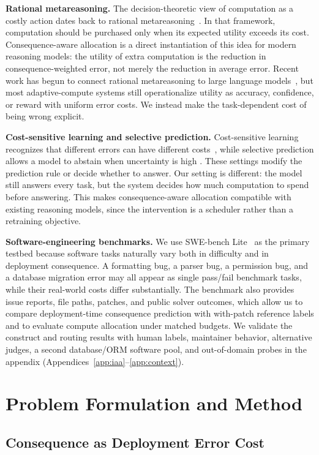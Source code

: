 \documentclass{article}
\begin{document}
\textbf{Rational metareasoning.}
The decision-theoretic view of computation as a costly action dates
back to rational metareasoning~\citep{russell1991right,
hay2012selecting}. In that framework, computation should be purchased
only when its expected utility exceeds its cost. Consequence-aware
allocation is a direct instantiation of this idea for modern reasoning
models: the utility of extra computation is the reduction in
consequence-weighted error, not merely the reduction in average error.
Recent work has begun to connect rational metareasoning to large
language models~\citep{yang2024rational}, but most adaptive-compute
systems still operationalize utility as accuracy, confidence, or reward
with uniform error costs. We instead make the task-dependent cost of
being wrong explicit.

\textbf{Cost-sensitive learning and selective prediction.}
Cost-sensitive learning recognizes that different errors can have
different costs~\citep{elkan2001foundations}, while selective
prediction allows a model to abstain when uncertainty is high
\citep{geifman2017selective}. These settings modify the prediction
rule or decide whether to answer. Our setting is different: the model
still answers every task, but the system decides how much computation
to spend before answering. This makes consequence-aware allocation
compatible with existing reasoning models, since the intervention is a
scheduler rather than a retraining objective.

\textbf{Software-engineering benchmarks.}
We use SWE-bench Lite~\citep{jimenez2023swebench} as the primary
testbed because software tasks naturally vary both in difficulty and
in deployment consequence. A formatting bug, a parser bug, a
permission bug, and a database migration error may all appear as
single pass/fail benchmark tasks, while their real-world costs differ
substantially. The benchmark also provides issue reports, file paths,
patches, and public solver outcomes, which allow us to compare
deployment-time consequence prediction with with-patch reference
labels and to evaluate compute allocation under matched budgets. We
validate the construct and routing results with human labels,
maintainer behavior, alternative judges, a second database/ORM
software pool, and out-of-domain probes in the appendix
(Appendices~\ref{app:iaa}--\ref{app:context}).
\section{Problem Formulation and Method}
\subsection{Consequence as Deployment Error Cost}
\label{sec:cons}
\end{document}
